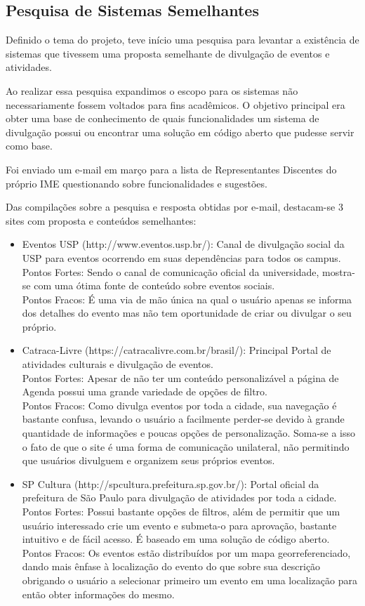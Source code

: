 \subsection{Pesquisa de Sistemas Semelhantes}
\par Definido o tema do projeto, teve início uma pesquisa para levantar a existência de sistemas que tivessem uma proposta semelhante de divulgação de eventos e atividades.
\par Ao realizar essa pesquisa expandimos o escopo para os sistemas não necessariamente fossem voltados para fins acadêmicos. O objetivo principal era obter uma base de conhecimento de quais funcionalidades um sistema de divulgação possui ou  encontrar uma solução em código aberto que pudesse servir como base.
 \par Foi enviado um e-mail em março para a lista de Representantes Discentes do próprio IME questionando sobre funcionalidades e sugestões.
\par Das compilações sobre a pesquisa e resposta obtidas por e-mail, destacam-se 3 sites com proposta e conteúdos semelhantes:
\begin{itemize}
\item{Eventos USP (http://www.eventos.usp.br/):}
Canal de divulgação social da USP para eventos ocorrendo em suas dependências para todos os campus.\\
Pontos Fortes: Sendo o canal de comunicação oficial da universidade, mostra-se com uma ótima fonte de conteúdo sobre eventos sociais.\\
Pontos Fracos: É uma via de mão única na qual o usuário apenas se informa dos detalhes do evento mas não tem oportunidade de criar ou divulgar o seu próprio.
\item {Catraca-Livre (https://catracalivre.com.br/brasil/):} Principal Portal de atividades culturais e divulgação de eventos.\\
Pontos Fortes: Apesar de não ter um conteúdo personalizável a página de Agenda possui uma grande variedade de opções de filtro.\\
Pontos Fracos: Como divulga eventos por toda a cidade, sua navegação é bastante confusa, levando o usuário a facilmente perder-se devido à grande quantidade de informações e poucas opções de personalização. Soma-se a isso o fato de que o site é uma forma de comunicação unilateral, não permitindo que usuários divulguem e organizem seus próprios eventos.
\item {SP Cultura (http://spcultura.prefeitura.sp.gov.br/):} Portal oficial da prefeitura de São Paulo para divulgação de atividades por toda a cidade.\\
Pontos Fortes: Possui bastante opções de filtros, além de permitir que um usuário interessado crie um evento e submeta-o para aprovação, bastante intuitivo e de fácil acesso. É baseado em uma solução de código aberto.\\
Pontos Fracos: Os eventos estão distribuídos por um mapa georreferenciado, dando mais ênfase à localização do evento do que sobre sua descrição obrigando o usuário a selecionar primeiro um evento em uma localização para então obter informações do mesmo.
\end{itemize}
